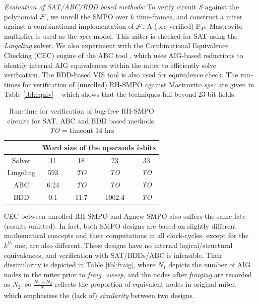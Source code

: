 {\it Evaluation of SAT/ABC/BDD based methods:} To verify circuit $S$
against the polynomial ${\mathcal{F}}$, we unroll the SMPO over $k$ time-frames,
and construct a miter against a combinational implementation of ${\mathcal{F}}$.
A (pre-verified) ${\mathbb{F}}_{2^k}$ Mastrovito multiplier \cite{mastro:1989} is
used as the {\it spec} model. This miter is checked for SAT using the
\emph{Lingeling} \cite{biere2013lingeling} solver. We also experiment
with the Combinational Equivalence Checking (CEC) engine of the ABC
tool \cite{abc}, which uses AIG-based reductions to identify internal
AIG equivalences within the miter to efficiently solve
verification. The BDD-based VIS tool \cite{brayton1996vis} is also used
for equivalence check. The run-times for verification of (unrolled)
RH-SMPO against Mastrovito {\it   spec} are given in Table
\ref{tbl:equiv} -- which shows that the techniques fail beyond 23 bit
fields.  

\begin{table}[bp]
\centering
\caption{\small Run-time for verification of bug-free RH-SMPO circuits
  for SAT, ABC and BDD based methods. \emph{TO} = timeout 14 hrs}
\label{tbl:equiv}
\begin{tabular}{|c||c|c|c|c|} 
\hline
& \multicolumn{4}{|c|}{Word size of the operands $k$-bits}  \\
\hline
Solver & 11 & 18 & 23 & 33 \\
\hline
\hline
Lingeling & 593  & \emph{TO}  & \emph{TO}  & \emph{TO}\\
\hline
\hline
ABC & 6.24 & \emph{TO} & \emph{TO} & \emph{TO}\\
\hline
\hline
BDD & 0.1 & 11.7 & 1002.4 & \emph{TO}  \\
\hline
\end{tabular}
\label{table:satbdd}  
\end{table} 

CEC between unrolled RH-SMPO and Agnew-SMPO also suffers the same fate
(results omitted). In fact, both SMPO designs are based on slightly
different mathematical concepts and their computations in all
clock-cycles, except for the $k^{th}$ one, are also different. These
designs have no internal logical/structural equivalences, and
verification with SAT/BDDs/ABC is infeasible. Their dissimilarity is
depicted in Table \ref{tbl:fraig}, where  $N_1$ depicts the number of
AIG nodes in the miter prior to {\it fraig\_sweep}, and the nodes
after {\it fraiging} are recorded as $N_2$; so $\frac{N_1-N_2}{N_1}$
reflects the proportion of equivalent nodes in original miter, which
emphasizes the (lack of) \emph{similarity} between two designs.  

